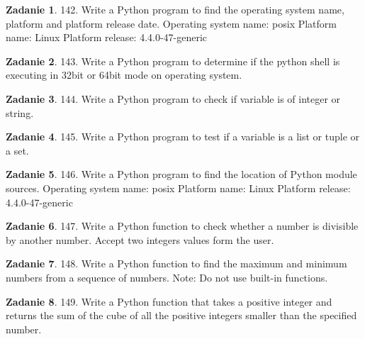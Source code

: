 \documentclass[11pt]{article}
\theoremstyle{definition}
\newtheorem{zadanie}{Zadanie}
\begin{document}
\begin{zadanie}


142. Write a Python program to find the operating system name, platform and platform release date. 
Operating system name:
posix
Platform name:
Linux
Platform release:
4.4.0-47-generic

\end{zadanie}

\begin{zadanie}


143. Write a Python program to determine if the python shell is executing in 32bit or 64bit mode on operating system. 

\end{zadanie}

\begin{zadanie}


144. Write a Python program to check if variable is of integer or string. 

\end{zadanie}

\begin{zadanie}


145. Write a Python program to test if a variable is a list or tuple or a set. 

\end{zadanie}

\begin{zadanie}


146. Write a Python program to find the location of Python module sources. 
Operating system name:
posix
Platform name:
Linux
Platform release:
4.4.0-47-generic

\end{zadanie}

\begin{zadanie}


147. Write a Python function to check whether a number is divisible by another number. Accept two integers values form the user. 

\end{zadanie}

\begin{zadanie}


148. Write a Python function to find the maximum and minimum numbers from a sequence of numbers. 
Note: Do not use built-in functions.

\end{zadanie}

\begin{zadanie}


149. Write a Python function that takes a positive integer and returns the sum of the cube of all the positive integers smaller than the specified number. 

\end{zadanie}
\end{document}
